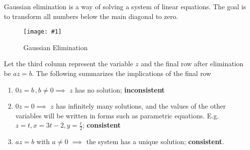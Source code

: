 \documentclass[11pt]{article}
\newcommand{\img}[3]{\begin{center}
  \begin{figure}[H]
    \centering
    \texttt{[image: \#1]}
    \caption{#3}
    \label{fig:fig1}
  \end{figure}
\end{center}}
\begin{document}
\noindent Gaussian elimination is a way of solving a system of linear equations. The goal is to transform all numbers below the main diagonal to zero.

\img{figs/gauss.png}{0.5}{Gaussian Elimination}

\noindent Let the third column represent the variable $z$ and the final row after elimination be $az = b$. The following summarizes the implications of the final row
\begin{enumerate}
  \item $0z = b\,,b\not=0 \implies $ $z$ has no solution; \textbf{inconsistent}
  \item $0z = 0 \implies $ $z$ has infinitely many solutions, and the values of the other variables will be written in forms such as parametric equations. E.g. $z = t, x = 3t - 2, y = \frac{t}{2}$; \textbf{consistent}
  \item $az = b$ with $a \not = 0$ $\implies$ the system has a unique solution; \textbf{consistent}.
\end{enumerate}
\end{document}
